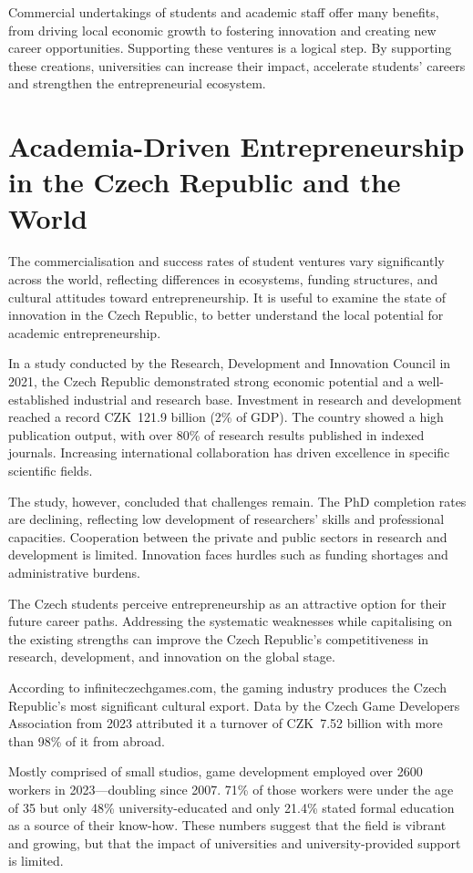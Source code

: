 Commercial undertakings of students and academic staff offer many benefits, from driving local economic growth to fostering innovation and creating new career opportunities. Supporting these ventures is a logical step. By supporting these creations, universities can increase their impact, accelerate students' careers and strengthen the entrepreneurial ecosystem.

\section{Academia-Driven Entrepreneurship in the Czech Republic and the World}
The commercialisation and success rates of student ventures vary significantly across the world, reflecting differences in ecosystems, funding structures, and cultural attitudes toward entrepreneurship. It is useful to examine the state of innovation in the Czech Republic, to better understand the local potential for academic entrepreneurship.

In a study conducted by the Research, Development and Innovation Council in 2021, the Czech Republic demonstrated strong economic potential and a well-established industrial and research base. Investment in research and development reached a record CZK~121.9 billion (2\% of GDP). The country showed a high publication output, with over 80\% of research results published in indexed journals. Increasing international collaboration has driven excellence in specific scientific fields.\cite{kauffman_tech-transfer}

The study, however, concluded that challenges remain. The PhD completion rates are declining, reflecting low development of researchers' skills and professional capacities. Cooperation between the private and public sectors in research and development is limited. Innovation faces hurdles such as funding shortages and administrative burdens.

The Czech students perceive entrepreneurship as an attractive option for their future career paths. Addressing the systematic weaknesses while capitalising on the existing strengths can improve the Czech Republic’s competitiveness in research, development, and innovation on the global stage.\cite{Antlova_entrepreneurship-cz}

According to infiniteczechgames.com, the gaming industry produces the Czech Republic’s most significant cultural export. Data by the Czech Game Developers Association from 2023 attributed it a turnover of CZK~7.52 billion with more than 98\% of it from abroad.\cite{Žák-gaming, Czech-Developers_INDUSTRY}

Mostly comprised of small studios, game development employed over 2600 workers in 2023---doubling since 2007. 71\% of those workers were under the age of 35 but only 48\% university-educated and only 21.4\% stated formal education as a source of their know-how. These numbers suggest that the field is vibrant and growing, but that the impact of universities and university-provided support is limited.\cite{Žák-gaming, Czech-Developers_INDUSTRY}
